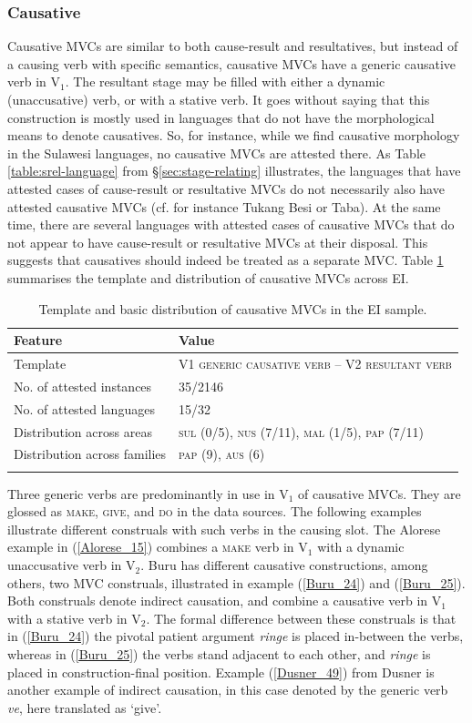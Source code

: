 \subsubsection{Causative}

Causative MVCs are similar to both cause-result and resultatives, but instead of a causing verb with specific semantics, causative MVCs have a generic causative verb in V$_1$. The resultant stage may be filled with either a dynamic (unaccusative) verb, or with a stative verb. It goes without saying that this construction is mostly used in languages that do not have the morphological means to denote causatives. So, for instance, while we find causative morphology in the Sulawesi languages, no causative MVCs are attested there. As Table \ref{table:srel-language} from §\ref{sec:stage-relating} illustrates, the languages that have attested cases of cause-result or resultative MVCs do not necessarily also have attested causative MVCs (cf. for instance Tukang Besi or Taba). At the same time, there are several languages with attested cases of causative MVCs that do not appear to have cause-result or resultative MVCs at their disposal. This suggests that causatives should indeed be treated as a separate MVC. Table \ref{table:causative} summarises the template and distribution of causative MVCs across EI.

\begin{table}
\begin{tabular}{ll}
\lsptoprule
Feature&Value\tabularnewline
\midrule
Template&V1 \textsc{generic causative verb} -- V2 \textsc{resultant verb}\tabularnewline
No. of attested instances& 35/2146 \tabularnewline
No. of attested languages& 15/32 \tabularnewline
Distribution across areas& \textsc{sul} (0/5), \textsc{nus} (7/11), \textsc{mal} (1/5), \textsc{pap} (7/11) \tabularnewline
Distribution across families& \textsc{pap} (9), \textsc{aus} (6) \tabularnewline
\lspbottomrule
\end{tabular}
\caption[Template and basic distribution of causative MVCs]{Template and basic distribution of causative MVCs in the EI sample.}
\label{table:causative}
\end{table}

Three generic verbs are predominantly in use in V$_1$ of causative MVCs. They are glossed as \textsc{make}, \textsc{give}, and \textsc{do} in the data sources. The following examples illustrate different construals with such verbs in the causing slot. The Alorese example in (\ref{Alorese_15}) combines a \textsc{make} verb in V$_1$ with a dynamic unaccusative verb in V$_2$. Buru has different causative constructions, among others, two MVC construals, illustrated in example (\ref{Buru_24}) and (\ref{Buru_25}). Both construals denote indirect causation, and combine a causative verb in V$_1$ with a stative verb in V$_2$. The formal difference between these construals is that in (\ref{Buru_24}) the pivotal patient argument \textit{ringe} is placed in-between the verbs, whereas in (\ref{Buru_25}) the verbs stand adjacent to each other, and \textit{ringe} is placed in construction-final position. Example (\ref{Dusner_49}) from Dusner is another example of indirect causation, in this case denoted by the generic verb \textit{ve}, here translated as `give'. 

